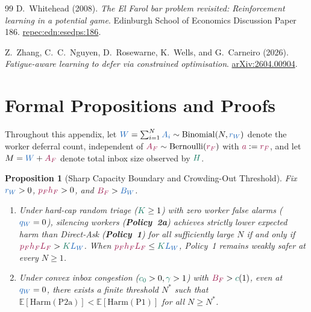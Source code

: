 \documentclass[11pt,reqno]{amsart}
\theoremstyle{spacious}
\newtheorem{proposition}{Proposition}[section]
\newcommand{\Wtxt}[1]{\textcolor{colW}{#1}}
\newcommand{\Wv}[1]{{\color{colW}#1}}
\newcommand{\Fv}[1]{{\color{colF}#1}}
\newcommand{\Hv}[1]{{\color{colH}#1}}
\newcommand{\E}{\mathbb{E}}
\begin{document}
\begin{thebibliography}{99}
\enlargethispage{1.2\baselineskip}
D.~Whitehead (2008). \emph{The El Farol bar problem revisited: Reinforcement learning in a potential game}. Edinburgh School of Economics Discussion Paper 186. \href{https://ideas.repec.org/p/edn/esedps/186.html}{repec:edn:esedps:186}.

Z.~Zhang, C.~C.~Nguyen, D.~Rosewarne, K.~Wells, and G.~Carneiro (2026). \emph{Fatigue-aware learning to defer via constrained optimisation}. \href{https://arxiv.org/abs/2604.00904}{arXiv:2604.00904}.

\end{thebibliography}
\endgroup

\clearpage
\appendix

\section{Formal Propositions and Proofs}
\label{app:proofs}

Throughout this appendix, let $\Wv{W} = \sum_{i=1}^N \Wv{A_i} \sim \mathrm{Binomial}(N, \Wv{r_W})$ denote the \Wtxt{worker} deferral count, independent of $\Fv{A_F} \sim \mathrm{Bernoulli}(\Fv{r_F})$ with $\Fv{a} := \Fv{r_F}$, and let $M = \Wv{W} + \Fv{A_F}$ denote total inbox size observed by $\Hv{H}$.

\begin{proposition}[Sharp Capacity Boundary and Crowding-Out Threshold]
\label{prop:crowding}
Fix $\Wv{r_W} > 0$, $\Fv{p_F h_F} > 0$, and $\Fv{B_F} > \Wv{B_W}$.
\begin{enumerate}
  \setlength{\itemsep}{4pt}
  \item[(i)] Under hard-cap random triage ($\Hv{K} \ge 1$) with zero \Wtxt{worker} false alarms ($\Wv{q_W} = 0$), silencing \Wtxt{workers} (\textbf{Policy~2a}) achieves strictly lower expected harm than Direct-Ask (\textbf{Policy~1}) for all sufficiently large $N$ \emph{if and only if} $\Fv{p_F h_F L_F} > \Hv{K} \Wv{L_W}$. When $\Fv{p_F h_F L_F} \le \Hv{K} \Wv{L_W}$, Policy~1 remains weakly safer at every $N \ge 1$.
  \item[(ii)] Under convex inbox congestion ($\Hv{c_0} > 0, \Hv{\gamma} > 1$) with $\Fv{B_F} > \Hv{c}(1)$, even at $\Wv{q_W} = 0$, there exists a finite threshold $N^*$ such that $\E[\mathrm{Harm}(\mathrm{P2a})] < \E[\mathrm{Harm}(\mathrm{P1})]$ for all $N \ge N^*$.
\end{enumerate}
\end{proposition}
\end{document}
